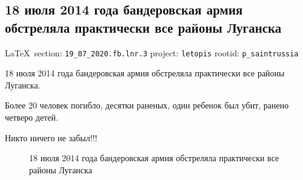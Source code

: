  
 

\subsection{18 июля 2014 года бандеровская армия обстреляла практически все районы Луганска}
  
\vspace{0.5cm}
{\small\LaTeX~section: \verb|19_07_2020.fb.lnr.3| project: \verb|letopis| rootid: \verb|p_saintrussia|}
\vspace{0.5cm}
  
18 июля 2014 года бандеровская армия обстреляла практически все районы
Луганска.

Более 20 человек погибло, десятки раненых, один ребенок был убит, ранено
четверо детей.

Никто ничего не забыл!!!

\begin{figure}[ht]
 \centering
 \caption{18 июля 2014 года бандеровская армия обстреляла практически все районы Луганска}
\end{figure}
